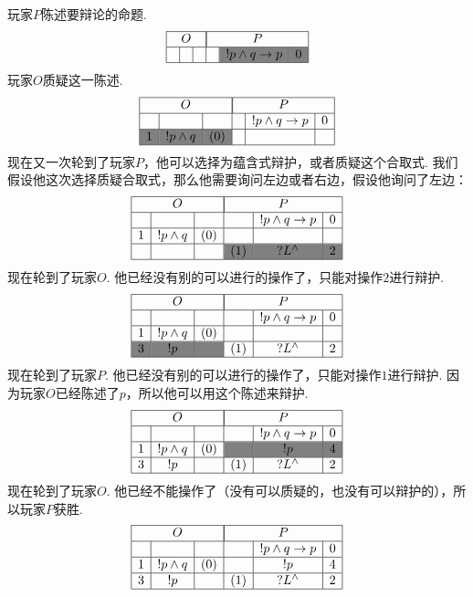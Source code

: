 \newcommand{\gray}{\cellcolor{gray}}
玩家$P$陈述要辩论的命题.
\[
    \begin{array}{|c|c|c|c|c|c|}
    \hline
        \multicolumn{3}{|c|}{O} & \multicolumn{3}{|c|}{P} \\\hline
        &&&&\gray !p\wedge q\to p&\gray 0\\
        \hline
    \end{array}
\]
玩家$O$质疑这一陈述.
\[
    \begin{array}{|c|c|c|c|c|c|}
    \hline
        \multicolumn{3}{|c|}{O} & \multicolumn{3}{|c|}{P} \\\hline
        &&&&!p\wedge q\to p&0\\\hline
        \gray 1&\gray !p\wedge q&\gray (0)&&&\\\hline
    \end{array}
\]
现在又一次轮到了玩家$P$，他可以选择为蕴含式辩护，或者质疑这个合取式. 我们假设他这次选择质疑合取式，那么他需要询问左边或者右边，假设他询问了左边：
\[
    \begin{array}{|c|c|c|c|c|c|}
    \hline
        \multicolumn{3}{|c|}{O} & \multicolumn{3}{|c|}{P} \\\hline
        &&&&!p\wedge q\to p&0\\\hline
        1&!p\wedge q& (0)&&&\\\hline
        &&&\gray (1)&\gray ? L^\wedge &\gray 2\\\hline
    \end{array}
\]
现在轮到了玩家$O$. 他已经没有别的可以进行的操作了，只能对操作$2$进行辩护.
\[
    \begin{array}{|c|c|c|c|c|c|}
    \hline
        \multicolumn{3}{|c|}{O} & \multicolumn{3}{|c|}{P} \\\hline
        &&&&!p\wedge q\to p&0\\\hline
        1&!p\wedge q& (0)&&&\\\hline
        \gray 3&\gray !p&\gray &(1)&? L^\wedge &2\\\hline
    \end{array}
\]
现在轮到了玩家$P$. 他已经没有别的可以进行的操作了，只能对操作$1$进行辩护. 因为玩家$O$已经陈述了$p$，所以他可以用这个陈述来辩护.
\[
    \begin{array}{|c|c|c|c|c|c|}
    \hline
        \multicolumn{3}{|c|}{O} & \multicolumn{3}{|c|}{P} \\\hline
        &&&&!p\wedge q\to p&0\\\hline
        1&!p\wedge q& (0)&\gray &\gray !p&\gray 4\\\hline
        3&!p&&(1)&? L^\wedge &2\\\hline
    \end{array}
\]
现在轮到了玩家$O$. 他已经不能操作了（没有可以质疑的，也没有可以辩护的），所以玩家$P$获胜.
\[
    \begin{array}{|c|c|c|c|c|c|}
    \hline
        \multicolumn{3}{|c|}{O} & \multicolumn{3}{|c|}{P} \\\hline
        &&&&!p\wedge q\to p&0\\\hline
        1&!p\wedge q& (0)&&!p&4\\\hline
        3&!p&&(1)&? L^\wedge &2\\\hline
    \end{array}
\]

